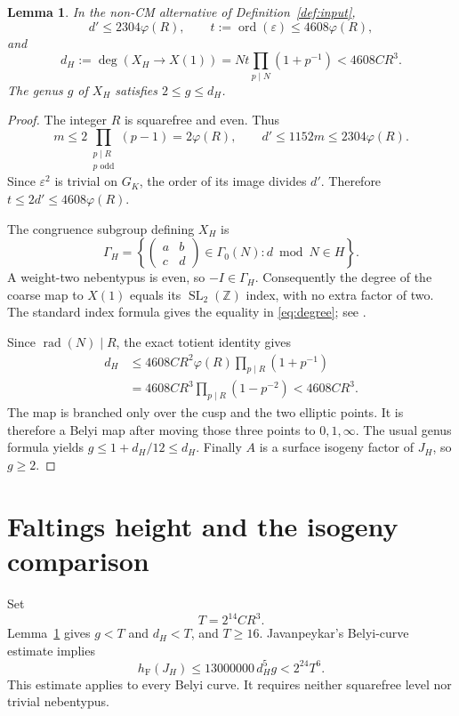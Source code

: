 \documentclass[11pt,a4paper]{article}
\newtheorem{lemma}[theorem]{Lemma}
\theoremstyle{definition}
\newcommand{\Z}{\mathbb Z}
\newcommand{\hF}{h_{\mathrm F}}
\newcommand{\rad}{\operatorname{rad}}
\newcommand{\ord}{\operatorname{ord}}
\begin{document}
\begin{lemma}\label{lem:degree}
In the non-CM alternative of Definition~\ref{def:input},
\[
 d'\le2304\varphi(R),\qquad
 t:=\ord(\varepsilon)\le4608\varphi(R),
\]
and
\begin{equation}\label{eq:degree}
 d_H:=\deg(X_H\longrightarrow X(1))
 =Nt\prod_{p\mid N}(1+p^{-1})
 <4608CR^3.
\end{equation}
The genus $g$ of $X_H$ satisfies $2\le g\le d_H$.
\end{lemma}
\begin{proof}
The integer $R$ is squarefree and even. Thus
\[
 m\le2\prod_{\substack{p\mid R\\p\text{ odd}}}(p-1)
      =2\varphi(R),
 \qquad
 d'\le1152m\le2304\varphi(R).
\]
Since $\varepsilon^2$ is trivial on $G_K$, the order of its image
divides $d'$. Therefore $t\le2d'\le4608\varphi(R)$.

The congruence subgroup defining $X_H$ is
\[
 \Gamma_H=\left\{
 \begin{pmatrix}a&b\\c&d\end{pmatrix}\in\Gamma_0(N):
 d\bmod N\in H\right\}.
\]
A weight-two nebentypus is even, so $-I\in\Gamma_H$. Consequently
the degree of the coarse map to $X(1)$ equals its
$\operatorname{SL}_2(\Z)$ index, with no extra factor of two.
The standard index formula gives the equality in \eqref{eq:degree};
see \cite[Section~4, equations~(4.1)--(4.2)]{vonKaenel}.

Since $\rad(N)\mid R$, the exact totient identity gives
\[
 \begin{split}
 d_H
 &\le4608CR^2\varphi(R)\prod_{p\mid R}(1+p^{-1})\\
 &=4608CR^3\prod_{p\mid R}(1-p^{-2})
 <4608CR^3.
 \end{split}
\]
The map is branched only over the cusp and the two elliptic
points. It is therefore a Belyi map after moving those three
points to $0,1,\infty$. The usual genus formula yields
$g\le1+d_H/12\le d_H$. Finally $A$ is a surface isogeny
factor of $J_H$, so $g\ge2$.
\end{proof}

\section{Faltings height and the isogeny comparison}

Set
\[
 T=2^{14}CR^3.
\]
Lemma~\ref{lem:degree} gives $g<T$ and $d_H<T$, and $T\ge16$.
Javanpeykar's Belyi-curve estimate
\cite[Theorem~1.1.1 and Section~2.3]{Javanpeykar} implies
\begin{equation}\label{eq:jacobian}
 \hF(J_H)\le13000000\,d_H^5g<2^{24}T^6.
\end{equation}
This estimate applies to every Belyi curve. It requires neither
squarefree level nor trivial nebentypus.
\end{document}
